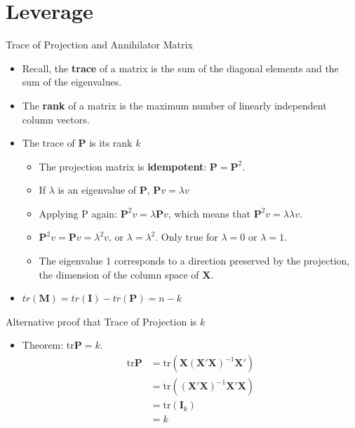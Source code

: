 \documentclass[aspectratio=169, handout, t]{beamer}
\numberwithin{equation}{section}
\begin{document}
\section{Leverage}

\begin{frame}{Trace of Projection and Annihilator Matrix}
\begin{itemize}
\item Recall, the \textbf{trace} of a matrix is the sum of the diagonal elements and the sum of the eigenvalues.
\item The \textbf{rank} of a matrix is the maximum number of linearly independent column vectors.
\item The trace of $\bm{P}$ is its rank $k$
\begin{itemize}
\item The projection matrix is \textbf{idempotent}: $\bm{P}=\bm{P}^2$.
\item If $\lambda$ is an eigenvalue of $\bm{P}$, $\bm{P}v=\lambda v$
\item Applying P again: $\bm{P}^2v=\lambda \bm{P}v$, which means that $\bm{P}^2v=\lambda\lambda v$.
\item $\bm{P}^2v=\bm{P}v=\lambda^2v$, or $\lambda=\lambda^2$.  Only true for $\lambda=0$ or $\lambda=1$.
\item The eigenvalue 1 corresponds to a direction preserved by the projection, the dimension of the column space of $\bm{X}$.
\end{itemize}
\item $tr(\bm{M})=tr(\bm{I})-tr(\bm{P})=n-k$
\end{itemize}
\end{frame}

\begin{frame}{Alternative proof that Trace of Projection is $k$}
\begin{itemize}
\item Theorem: $\text{tr} \bm{P}=k$.
\begin{align*}
\text{tr}\bm{P}&=\text{tr}\left(\bm{X}(\bm{X}'\bm{X})^{-1}\bm{X}'\right)\\
&=\text{tr}\left((\bm{X}'\bm{X})^{-1}\bm{X}'\bm{X}\right)\\
&=\text{tr}(\bm{I}_k)\\
&=k
\end{align*}
\end{itemize}
\end{frame}
\end{document}
